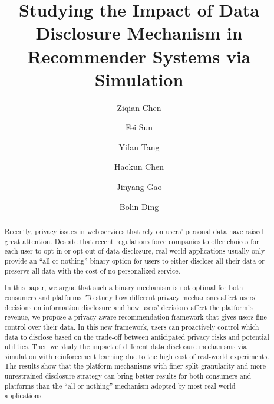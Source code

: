 \documentclass[acmsmall]{acmart}
\begin{document}
\title{Studying the Impact of Data Disclosure Mechanism in Recommender Systems via Simulation}

\author{Ziqian Chen}

\author{Fei Sun}

\author{Yifan Tang}

\author{Haokun Chen}

\author{Jinyang Gao}


\author{Bolin Ding}


\begin{abstract}

Recently, privacy issues in web services that rely on users' personal data have raised great attention.
Despite that recent regulations force companies to offer choices for each user to opt-in or opt-out of data disclosure, real-world applications usually only provide an ``all or nothing'' binary option for users to either disclose all their data or preserve all data with the cost of no personalized service.


In this paper, we argue that such a binary mechanism is not optimal for both consumers and platforms.
To study how different privacy mechanisms affect users' decisions on information disclosure and how users' decisions affect the platform's revenue, we propose a privacy aware recommendation framework that gives users fine control over their data. 
In this new framework, users can proactively control which data to disclose based on the trade-off between anticipated privacy risks and potential utilities.
Then we study the impact of different data disclosure mechanisms via simulation with reinforcement learning due to the high cost of real-world experiments.
The results show that the platform mechanisms with finer split granularity and more unrestrained disclosure strategy can bring better results for both consumers and platforms than the ``all or nothing''  mechanism adopted by most real-world applications.


\end{abstract}
\end{document}
